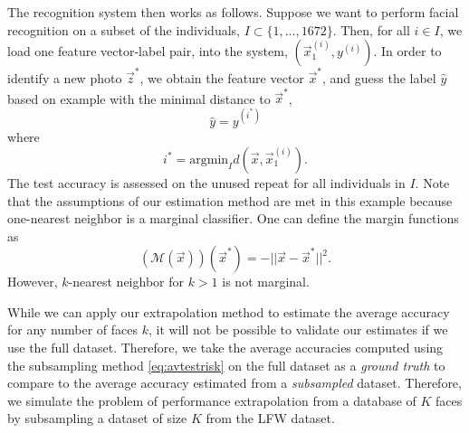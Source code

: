 The recognition system then works as follows.  Suppose we want to
perform facial recognition on a subset of the individuals, $I \subset
\{1,\hdots, 1672\}$.  Then, for all $i \in I$, we load one feature
vector-label pair, into the system, $(\vec{x}_1^{(i)}, y^{(i)})$.  In
order to identify a new photo $\vec{z}^*$, we obtain the feature
vector $\vec{x}^*$, and guess the label $\hat{y}$ based on example
with the minimal distance to $\vec{x}^*$,
\[
\hat{y} = y^{(i^*)}
\]
where
\[
i^* = \text{argmin}_I d(\vec{x}, \vec{x}_1^{(i)}).
\]
The test accuracy is assessed on the unused repeat for all individuals
in $I$.  Note that the assumptions of our estimation method are met in
this example because one-nearest neighbor is a marginal classifier.
One can define the margin functions as
\[
(\mathcal{M}(\vec{x}))(\vec{x}^*) = -||\vec{x} - \vec{x}^*||^2.
\]
However, $k$-nearest neighbor for $k > 1$ is not marginal.

While we can apply our extrapolation method to estimate the average
accuracy for any number of faces $k$, it will not be possible to
validate our estimates if we use the full dataset.  Therefore, we take
the average accuracies computed using the subsampling method
\eqref{eq:avtestrisk} on the full dataset as a \emph{ground truth} to
compare to the average accuracy estimated from a \emph{subsampled}
dataset.  Therefore, we simulate the problem of performance
extrapolation from a database of $K$ faces by subsampling a
dataset of size $K$ from the LFW dataset.


